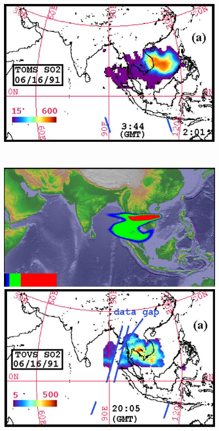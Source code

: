 \begin{figure}[!htb]
\begin{minipage}{.325\textwidth}
    \end{minipage}%
    \begin{minipage}{.325 \textwidth}
        \centering
        \includegraphics[width=0.99 \textwidth]{Chapter-7/Figures/OB-SO2-23hr-ash}
    \end{minipage}%
    \\
    \begin{minipage}{.325\textwidth}
        \centering
        \includegraphics[width=0.99 \textwidth]{Chapter-7/Figures/SPH-Plume-31hr-ash}
    \end{minipage}%
    \begin{minipage}{.325 \textwidth}
        \centering
        \includegraphics[width=0.99 \textwidth]{Chapter-7/Figures/OB-SO2-31hr-ash}

\end{minipage}
\end{figure}
